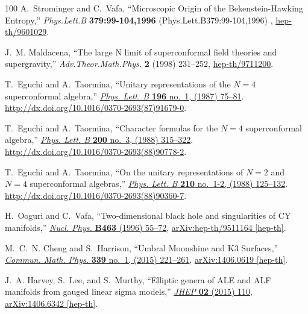 \begin{thebibliography}{100}
A.~Strominger and C.~Vafa, ``{Microscopic Origin of the Bekenstein-Hawking
  Entropy},'' {\em Phys.Lett.B} {\bfseries 379:99-104,1996}
  (Phys.Lett.B379:99-104,1996) ,
  \href{http://arxiv.org/abs/hep-th/9601029}{{\ttfamily hep-th/9601029}}.

J.~M. Maldacena, ``The large {N} limit of superconformal field theories and
  supergravity,'' {\em Adv.Theor.Math.Phys.} {\bfseries 2} (1998) 231--252,
  \href{http://arxiv.org/abs/hep-th/9711200}{{\ttfamily hep-th/9711200}}.

T.~Eguchi and A.~Taormina, ``Unitary representations of the {$N=4$}
  superconformal algebra,''
  \href{http://dx.doi.org/10.1016/0370-2693(87)91679-0}{{\em Phys. Lett. B}
  {\bfseries 196} no.~1, (1987) 75--81}.
  \url{http://dx.doi.org/10.1016/0370-2693(87)91679-0}.

T.~Eguchi and A.~Taormina, ``Character formulas for the {$N=4$} superconformal
  algebra,'' \href{http://dx.doi.org/10.1016/0370-2693(88)90778-2}{{\em Phys.
  Lett. B} {\bfseries 200} no.~3, (1988) 315--322}.
  \url{http://dx.doi.org/10.1016/0370-2693(88)90778-2}.

T.~Eguchi and A.~Taormina, ``On the unitary representations of {$N=2$} and
  {$N=4$} superconformal algebras,''
  \href{http://dx.doi.org/10.1016/0370-2693(88)90360-7}{{\em Phys. Lett. B}
  {\bfseries 210} no.~1-2, (1988) 125--132}.
  \url{http://dx.doi.org/10.1016/0370-2693(88)90360-7}.

H.~Ooguri and C.~Vafa, ``{Two-dimensional black hole and singularities of CY
  manifolds},'' \href{http://dx.doi.org/10.1016/0550-3213(96)00008-9}{{\em
  Nucl. Phys.} {\bfseries B463} (1996) 55--72},
\href{http://arxiv.org/abs/hep-th/9511164}{{\ttfamily arXiv:hep-th/9511164
  [hep-th]}}.

M.~C.~N. Cheng and S.~Harrison, ``{Umbral Moonshine and K3 Surfaces},''
  \href{http://dx.doi.org/10.1007/s00220-015-2398-5}{{\em Commun. Math. Phys.}
  {\bfseries 339} no.~1, (2015) 221--261},
\href{http://arxiv.org/abs/1406.0619}{{\ttfamily arXiv:1406.0619 [hep-th]}}.

J.~A. Harvey, S.~Lee, and S.~Murthy, ``{Elliptic genera of ALE and ALF
  manifolds from gauged linear sigma models},''
  \href{http://dx.doi.org/10.1007/JHEP02(2015)110}{{\em JHEP} {\bfseries 02}
  (2015) 110},
\href{http://arxiv.org/abs/1406.6342}{{\ttfamily arXiv:1406.6342 [hep-th]}}.


\end{thebibliography}
